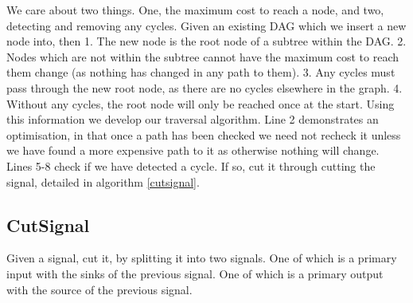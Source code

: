 \documentclass[12pt,final,oneside]{article} %
\begin{document}
We care about two things. One, the maximum cost to reach a node, and two, detecting and removing any cycles.
Given an existing \ac{DAG}  which we insert a new node into, then 1. The new node is the root node of a subtree within the \ac{DAG}. 2. Nodes which are not within the subtree cannot have the maximum cost to reach them change (as nothing has changed in any path to them). 3. Any cycles must pass through the new root node, as there are no cycles elsewhere in the graph. 4. Without any cycles, the root node will only be reached once at the start.
Using this information we develop our traversal algorithm.
Line 2 demonstrates an optimisation, in that once a path has been checked we need not recheck it unless we have found a more expensive path to it as otherwise nothing will change.
Lines 5-8 check if we have detected a cycle. If so, cut it through cutting the signal, detailed in algorithm \ref{cutsignal}.


\newpage
\subsection{CutSignal}
Given a signal, cut it, by splitting it into two signals. One of which is a primary input with the sinks of the previous signal. One of which is a primary output with the source of the previous signal.
\end{document}
